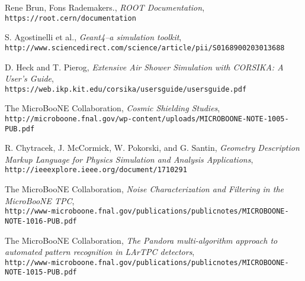 \begin{thebibliography}{20}
  Rene Brun, Fons Rademakers., \emph{ROOT Documentation}, \\
  \texttt{https://root.cern/documentation}
  
  S. Agostinelli et al., \emph{Geant4--a simulation toolkit},\\
  \texttt{http://www.sciencedirect.com/science/article/pii/S0168900203013688}
  
  D. Heck and T. Pierog, \emph{Extensive Air Shower Simulation with CORSIKA: A User's Guide},\\
  \texttt{https://web.ikp.kit.edu/corsika/usersguide/usersguide.pdf}
  

  The MicroBooNE Collaboration, \emph{Cosmic Shielding Studies},\\
  \texttt{http://microboone.fnal.gov/wp-content/uploads/MICROBOONE-NOTE-1005-PUB.pdf}
  
  
  R. Chytracek, J. McCormick, W. Pokorski, and G. Santin, \emph{Geometry Description Markup Language for Physics Simulation and Analysis Applications}, \\
  \texttt{http://ieeexplore.ieee.org/document/1710291}

  The MicroBooNE Collaboration, \emph{Noise Characterization and Filtering in the MicroBooNE TPC},\\
  \texttt{http://www-microboone.fnal.gov/publications/publicnotes/MICROBOONE-NOTE-1016-PUB.pdf}

  The MicroBooNE Collaboration, \emph{The Pandora multi-algorithm approach to automated pattern recognition in LArTPC detectors},\\
  \texttt{http://www-microboone.fnal.gov/publications/publicnotes/MICROBOONE-NOTE-1015-PUB.pdf}



\end{thebibliography}
